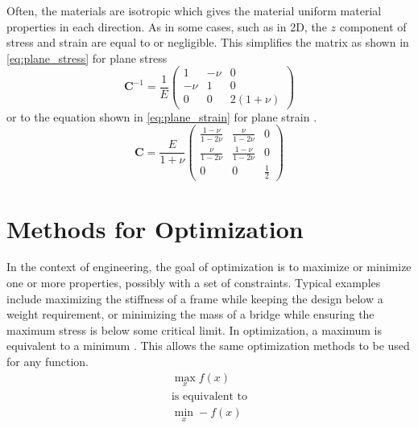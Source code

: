Often, the materials are isotropic which gives the material uniform material properties in each direction. As in some cases, such as in 2D, the $z$ component of stress and strain are equal to or negligible. This simplifies the matrix as shown in \ref{eq:plane_stress} for plane stress
\begin{equation}
	\mathbf C^{-1} = \frac{1}{E}\begin{pmatrix}
		1 & -\nu & 0 \\
		-\nu & 1 & 0 \\
		0 & 0 & 2(1+\nu)
	\end{pmatrix}
	\label{eq:plane_stress}
\end{equation}
or to the equation shown in \ref{eq:plane_strain} for plane strain \cite{Lubliner_Papadopoulos_2014}.
\begin{equation}
	\mathbf C = \frac{E}{1+\nu} \begin{pmatrix}
		\frac{1-\nu}{1-2\nu} & \frac{\nu}{1-2\nu} & 0 \\
		\frac{\nu}{1-2\nu} & \frac{1-\nu}{1-2\nu} & 0 \\
		0 & 0 & \frac{1}{2}
	\end{pmatrix}
	\label{eq:plane_strain}
\end{equation}


\section{Methods for Optimization}
\label{chap:methods_for_optimization}
In the context of engineering, the goal of optimization is to maximize or minimize one or more properties, possibly with a set of constraints. Typical examples include maximizing the stiffness of a frame while keeping the design below a weight requirement, or minimizing the mass of a bridge while ensuring the maximum stress is below some critical limit. In optimization, a maximum is equivalent to a minimum \cite{Kochenderfer_Wheeler_2019}. This allows the same optimization methods to be used for any function.
\begin{equation}
	\begin{matrix}
		\max_x f(x) \\
		\text{is equivalent to} \\
		\min_x -f(x)
	\end{matrix}
\end{equation}

